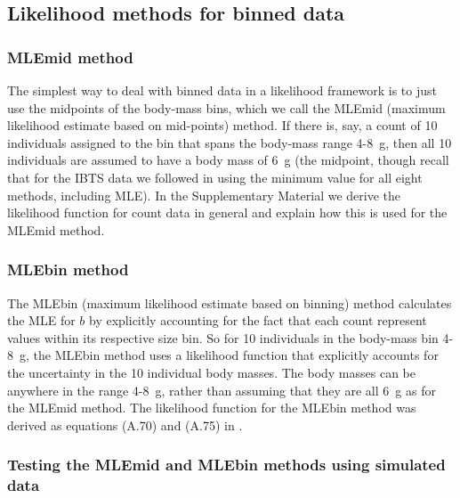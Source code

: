 \documentclass[12pt, letter]{article}
\newcommand{\MEE}{erpbb17}     %
\begin{document}




\subsection{Likelihood methods for binned data}


\subsubsection{MLEmid method}

The simplest way to deal with binned data in a likelihood framework is to just
use the midpoints of the body-mass bins, which we call the MLEmid (maximum
likelihood estimate based on mid-points) method. If there is, say, a count of 10
individuals assigned to the bin that spans the body-mass range 4-8~g, then all
10 individuals are assumed to have a body mass of 6~g (the midpoint, though
recall that for the IBTS data we followed \citealt{ffrr12} in using the minimum value for all eight methods,
including MLE). In
the Supplementary Material we derive the likelihood function for count data in
general and explain how this is used for the MLEmid method.

\subsubsection{MLEbin method}

The MLEbin (maximum likelihood estimate based on binning) method calculates the
MLE for $b$ by explicitly accounting for the fact that each count represent
values within its respective size bin. So for 10 individuals in the body-mass
bin 4-8~g, the MLEbin method uses a likelihood function that explicitly accounts
for the uncertainty in the 10 individual body masses. The body masses can be
anywhere in the range 4-8~g, rather than assuming that they are all 6~g as for
the MLEmid method. The likelihood function for the MLEbin method was derived as
equations (A.70) and (A.75) in \cite{\MEE}.

\subsubsection{Testing the MLEmid and MLEbin methods using simulated data}
\end{document}
